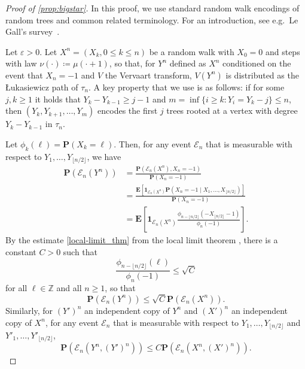 \documentclass[11pt,reqno]{amsart}
\renewcommand{\P}{\mathbf{P}}
\newcommand{\Z}{\mathbb{Z}}
\newcommand{\1}{\mathbf{1}}
\newcommand{\0}{\mathbf{0}}
\newcommand{\E}{{\mathbf E}}
\newcommand{\one}{\mathbf{1}}
\newcommand\cE{\mathcal E}
\newcommand{\eps}{\varepsilon}
\begin{document}
\begin{proof}[Proof of \cref{prop:bigstar}]
In this proof, we use standard random walk encodings of random trees and common related terminology. For an introduction, see e.g.\ Le Gall's survey~\cite{legall2005random}. 

Let $\eps>0$. Let $X^{n}=(X_k, 0\le k \le n)$ be a random walk with $X_0=0$ and steps with law $\nu(\cdot)\coloneqq \mu(\cdot+1)$, so that, for $Y^n$ defined as $X^n$ conditioned on the event that $X_n=-1$ and $V$ the Vervaart transform, $V(Y^n)$ is distributed as the \L ukasiewicz path of $\tau_n$. A key property that we use is as follows: if for some $j,k\ge 1$ it holds that $Y_k-Y_{k-1}\ge j-1$ and $m=\inf\{i\geq k :Y_i=Y_k-j\}\le n$, then $(Y_k, Y_{k+1},\dots, Y_m)$ encodes the first $j$ trees rooted at a vertex with degree $Y_k-Y_{k-1}$ in $\tau_n$.

Let $\phi_k(\ell)=\P(X_k=\ell)$. Then, for any event $\cE_n$ that is measurable with respect to $Y_1,\dots,Y_{\lfloor n/2\rfloor}$, we have 
\begin{align*}\P(\cE_n(Y^n))&=\frac{\P(\cE_n(X^n),X_n=-1 )}{\P(X_n=-1 )}\\
&=\frac{\E[\one_{\cE_n(X^n)}\P(X_n=-1\mid X_1,\dots,X_{\lfloor n/2\rfloor})]}{\P(X_n=-1 )}\\
&=\E\left[\one_{\cE_n(X^n)}\frac{\phi_{n-\lfloor n/2\rfloor}(-X_{\lfloor n/2\rfloor}-1) }{\phi_n(-1)}
\right].
\end{align*}
By the estimate \eqref{local-limit_thm} from the local limit theorem \cite{petrov2012sums}, there is a constant $C>0$ such that 
\[\frac{\phi_{n-\lfloor n/2\rfloor}(\ell) }{\phi_n(-1)}\le \sqrt{C}\]
for all $\ell\in \Z$ and all $n\ge 1$, so that 
\[\P(\cE_n(Y^n))\le \sqrt{C}\P(\cE_n(X^n) ).\]
Similarly, for $(Y')^n$ an independent copy of $Y^n$ and $(X')^n$ an independent copy of $X^n$, for any event $\cE_n$ that is measurable with respect to $Y_1,\dots,Y_{\lfloor n/2\rfloor}$ and $Y'_1,\dots,Y'_{\lfloor n/2\rfloor}$, 
\begin{equation}
\label{eq:like_independent}
\P(\cE_n(Y^n,(Y')^n))\le C\P(\cE_n(X^n,(X')^n)).
\end{equation}


\end{proof}
\end{document}
